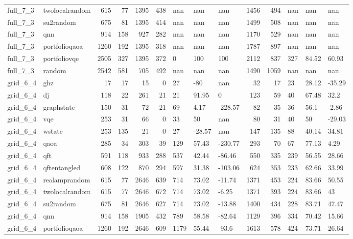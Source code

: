 \begin{longtable}{llrrrrlllrrlll}
full\_7\_3 & twolocalrandom & 615 & 77 & 1395 & 438 & nan & nan & nan & 1456 & 494 & nan & nan & nan \\
full\_7\_3 & su2random & 675 & 81 & 1395 & 414 & nan & nan & nan & 1499 & 508 & nan & nan & nan \\
full\_7\_3 & qnn & 914 & 158 & 927 & 282 & nan & nan & nan & 1170 & 529 & nan & nan & nan \\
full\_7\_3 & portfolioqaoa & 1260 & 192 & 1395 & 318 & nan & nan & nan & 1787 & 897 & nan & nan & nan \\
full\_7\_3 & portfoliovqe & 2505 & 327 & 1395 & 372 & 0 & 100 & 100 & 2112 & 837 & 327 & 84.52 & 60.93 \\
full\_7\_3 & random & 2542 & 581 & 705 & 492 & nan & nan & nan & 1490 & 1059 & nan & nan & nan \\
grid\_6\_4 & ghz & 17 & 17 & 15 & 0 & 27 & -80 & nan & 32 & 17 & 23 & 28.12 & -35.29 \\
grid\_6\_4 & dj & 118 & 22 & 261 & 21 & 21 & 91.95 & 0 & 123 & 59 & 40 & 67.48 & 32.2 \\
grid\_6\_4 & graphstate & 150 & 31 & 72 & 21 & 69 & 4.17 & -228.57 & 82 & 35 & 36 & 56.1 & -2.86 \\
grid\_6\_4 & vqe & 253 & 31 & 66 & 0 & 33 & 50 & nan & 80 & 31 & 40 & 50 & -29.03 \\
grid\_6\_4 & wstate & 253 & 135 & 21 & 0 & 27 & -28.57 & nan & 147 & 135 & 88 & 40.14 & 34.81 \\
grid\_6\_4 & qaoa & 285 & 34 & 303 & 39 & 129 & 57.43 & -230.77 & 293 & 70 & 67 & 77.13 & 4.29 \\
grid\_6\_4 & qft & 591 & 118 & 933 & 288 & 537 & 42.44 & -86.46 & 550 & 335 & 239 & 56.55 & 28.66 \\
grid\_6\_4 & qftentangled & 608 & 122 & 870 & 294 & 597 & 31.38 & -103.06 & 624 & 353 & 233 & 62.66 & 33.99 \\
grid\_6\_4 & realamprandom & 615 & 77 & 2646 & 639 & 714 & 73.02 & -11.74 & 1371 & 453 & 224 & 83.66 & 50.55 \\
grid\_6\_4 & twolocalrandom & 615 & 77 & 2646 & 672 & 714 & 73.02 & -6.25 & 1371 & 393 & 224 & 83.66 & 43 \\
grid\_6\_4 & su2random & 675 & 81 & 2646 & 627 & 714 & 73.02 & -13.88 & 1400 & 434 & 228 & 83.71 & 47.47 \\
grid\_6\_4 & qnn & 914 & 158 & 1905 & 432 & 789 & 58.58 & -82.64 & 1129 & 396 & 334 & 70.42 & 15.66 \\
grid\_6\_4 & portfolioqaoa & 1260 & 192 & 2646 & 609 & 1179 & 55.44 & -93.6 & 1613 & 578 & 424 & 73.71 & 26.64 \\

\end{longtable}
